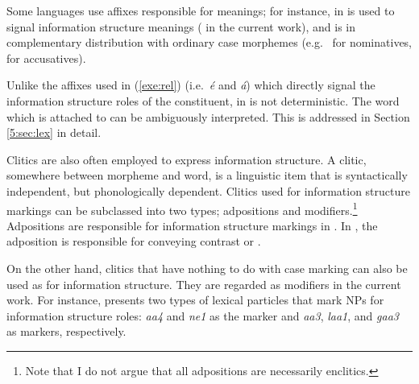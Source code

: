 \noindent Some languages use affixes responsible for  meanings;
for instance, \nun in  is used to signal information structure
meanings ( in the current work), and is in
complementary distribution with ordinary case morphemes (e.g.\ \ika
for nominatives, \lul for accusatives).






\noindent Unlike the  affixes used in (\ref{exe:rel})
(i.e.\ \textit{{\'e}} and \textit{{\'a}}) which directly signal the
information structure roles of the constituent, \nun in 
is not deterministic. The word which \nun is attached to can be
ambiguously interpreted. This is addressed in Section \ref{5:sec:lex} in
detail.




Clitics are also often employed to express information structure. A
clitic, somewhere between morpheme and word, is a linguistic
item that is syntactically independent, but phonologically dependent.
Clitics used for information structure markings can be subclassed into
two types; adpositions and modifiers.\footnote{Note that 
I do not argue that all adpositions are necessarily enclitics.} 
Adpositions are responsible for
information structure markings in . In
, the adposition \wa is responsible for conveying
contrast or .






\noindent On the other hand, clitics that have nothing to do with case
marking can also be used as  for information
structure. They are regarded as modifiers in the current work. For
instance, \citet{man:07} presents two types of  lexical
particles that mark NPs for information structure roles: \textit{aa4}
and \textit{ne1} as the  marker and \textit{aa3}, \textit{laa1},
and \textit{gaa3} as  markers, respectively.



